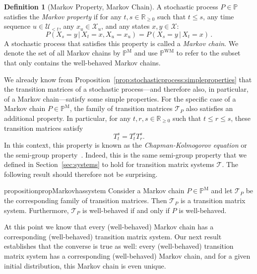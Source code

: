 \documentclass[10pt,a4paper]{paper}
\theoremstyle{definition}
\newtheorem{definition}{Definition}
\newcommand{\reals}{\mathbb{R}}
\newcommand{\realsnonneg}{\reals_{\geq 0}}
\newcommand{\states}{\mathcal{X}}
\newcommand{\processes}{\mathbb{P}}
\newcommand{\mprocesses}{\processes^{\mathrm{M}}}
\newcommand{\wmprocesses}{\processes^{\mathrm{WM}}}
\begin{document}
\begin{definition}[Markov Property, Markov Chain]\label{def:markov_property}
A stochastic process $P\in\processes$ satisfies the \emph{Markov property} if for any $t,s\in\realsnonneg$ such that $t\leq s$, any time sequence $u\in\mathcal{U}_{<t}$, any $x_u\in\states_u$, and any states $x,y\in\states$:
\begin{equation*}
P(X_s=y\,\vert\,X_t=x,X_u=x_u) = P(X_s=y\,\vert\, X_{t}=x)\,.
\end{equation*}
A stochastic process that satisfies this property is called a \emph{Markov chain}. We denote the set of all Markov chains by $\mprocesses$ and use $\wmprocesses$ to refer to the subset that only contains the well-behaved Markov chains.
\end{definition}

We already know from Proposition~\ref{prop:stochasticprocess:simpleproperties} that the transition matrices of a stochastic process---and therefore also, in particular, of a Markov chain---satisfy some simple properties. For the specific case of a Markov chain $P\in\mprocesses$, the family of transition matrices $\mathcal{T}_P$ also satisfies an additional property. In particular, for any $t,r,s\in\realsnonneg$ such that $t\leq r\leq s$, these transition matrices satisfy
\begin{equation}\label{eq:markovintermsofmatrices}
T_t^s = T_t^rT_r^s.
\end{equation}
In this context, this property is known as the \emph{Chapman-Kolmogorov equation} or the semi-group property~\cite{liggett2010continuous}. Indeed, this is the same semi-group property that we defined in Section~\ref{sec:systems} to hold for transition matrix systems $\mathcal{T}$. The following result should therefore not be surprising.

\begin{restatable}{proposition}{propMarkovhassystem}
\label{prop:Markovhassystem}
Consider a Markov chain $P\in\mprocesses$ and let $\mathcal{T}_P$ be the corresponding family of transition matrices. Then $\mathcal{T}_P$ is a transition matrix system. Furthermore, $\mathcal{T}_P$ is well-behaved if and only if $P$ is well-behaved.
\end{restatable}

At this point we know that every (well-behaved) Markov chain has a corresponding (well-behaved) transition matrix system. Our next result establishes that the converse is true as well: every (well-behaved) transition matrix system has a corresponding (well-behaved) Markov chain, and for a given initial distribution, this Markov chain is even unique.
\end{document}
